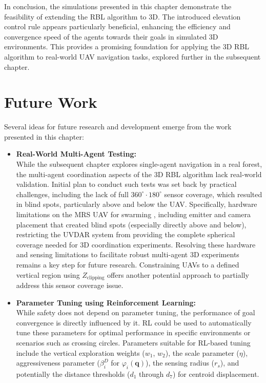         In conclusion, the simulations presented in this chapter demonstrate the feasibility of extending the RBL algorithm to 3D. 
        The introduced elevation control rule appears particularly beneficial, enhancing the efficiency and convergence speed of the agents towards their goals in simulated 3D environments. 
        This provides a promising foundation for applying the 3D RBL algorithm to real-world UAV navigation tasks, explored further in the subsequent chapter.
    
    \section{Future Work}
        Several ideas for future research and development emerge from the work presented in this chapter:
        \begin{itemize}
            \item \textbf{Real-World Multi-Agent Testing: } \\
            While the subsequent chapter explores single-agent navigation in a real forest, the multi-agent coordination aspects of the 3D RBL algorithm lack real-world validation. 
            Initial plan to conduct such tests was set back by practical challenges, including the lack of full $360^{\circ} \cdot 180^{\circ}$ sensor coverage, which resulted in blind spots, particularly above and below the \ac{UAV}.
            Specifically, hardware limitations on the \ac{MRS} \ac{UAV} for swarming \cite{robofly}, including emitter and camera placement that created blind spots (especially directly above and below), restricting the UVDAR system \cite{uvdar_package} from providing the complete spherical coverage needed for 3D coordination experiments.
            Resolving these hardware and sensing limitations to facilitate robust multi-agent 3D experiments remains a key step for future research.
            Constraining \ac{UAV}s to a defined vertical region using $Z_{\text{clipping}}$ offers another potential approach to partially address this sensor coverage issue.
            \item \textbf{Parameter Tuning using Reinforcement Learning: } \\
            While safety does not depend on parameter tuning, the performance of goal convergence is directly influenced by it.
            \ac{RL} could be used to automatically tune these parameters for optimal performance in specific environments or scenarios such as crossing circles. 
            Parameters suitable for \ac{RL}-based tuning include the vertical exploration weights ($w_1$, $w_2$), the scale parameter ($\eta$), aggressiveness parameter ($\beta_i^D$ for $\varphi_i(\mathbf{q})$), the sensing radius ($r_s$), and potentially the distance thresholds ($d_1$ through $d_7$) for centroid displacement.

\end{itemize}
